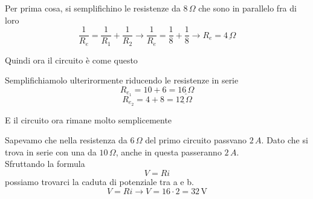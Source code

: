 Per prima cosa, si semplifichino le resistenze da $8\,\Omega$ che sono in parallelo fra di loro
\begin{equation*}
  \frac{1}{R_e} = \frac{1}{R_1} + \frac{1}{R_2} \rightarrow
  \frac{1}{R_e} = \frac{1}{8} + \frac{1}{8} \rightarrow
  R_e = \underline{4\,\Omega}
\end{equation*}

Quindi ora il circuito è come questo
\begin{center}
\end{center}

Semplifichiamolo ulterirormente riducendo le resistenze in serie
\begin{equation*}
  R_{e_1} = 10 + 6 = \underline{16\,\Omega}
\end{equation*}
\begin{equation*}
  R_{e_2} = 4 + 8 = \underline{12\,\Omega}
\end{equation*}

E il circuito ora rimane molto semplicemente
\begin{center}
\end{center}

Sapevamo che nella resistenza da $6\,\Omega$ del primo circuito passvano $2\,A$. Dato che si trova 
in serie con una da $10\,\Omega$, anche in questa passeranno $2\,A$.\\
Sfruttando la formula
\begin{equation*}
  V = Ri
\end{equation*}
possiamo trovarci la caduta di potenziale tra a e b.
\begin{equation*}
  V = Ri \rightarrow V = 16\cdot2 = \boxed{32\,\text{V}}
\end{equation*}

